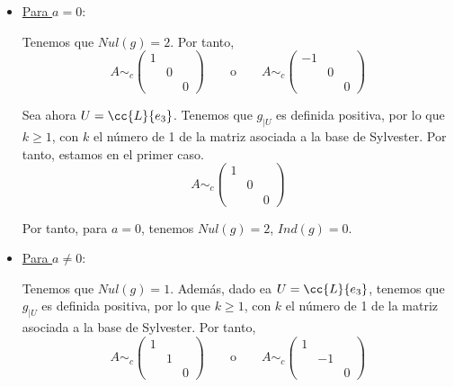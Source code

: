 \begin{ejercicio}
\begin{enumerate}
        \begin{itemize}
            \item \underline{Para $a=0$}:

            Tenemos que $Nul(g)=2$. Por tanto,
            \begin{equation*}
                A \sim_c \left(\begin{array}{ccc}
                    1 &  \\
                    & 0 \\
                    && 0 
                \end{array} \right)
                \qquad \text{o} \qquad
                A \sim_c \left(\begin{array}{ccc}
                    -1 &  \\
                    & 0 \\
                    && 0 
                \end{array} \right)
            \end{equation*}

            Sea ahora $U=\cc{L}\{e_3\}$. Tenemos que $g_{\left|U \right.}$ es definida positiva, por lo que $k\geq 1$, con $k$ el número de 1 de la matriz asociada a la base de Sylvester. Por tanto, estamos en el primer caso.
            \begin{equation*}
                A \sim_c \left(\begin{array}{ccc}
                    1 &  \\
                    & 0 \\
                    && 0 
                \end{array} \right)
            \end{equation*}

            Por tanto, para $a=0$, tenemos $Nul(g)=2$, $Ind(g)=0$.

            \item \underline{Para $a\neq0$}:

            Tenemos que $Nul(g)=1$. Además, dado ea $U=\cc{L}\{e_3\}$, tenemos que $g_{\left|U \right.}$ es definida positiva, por lo que $k\geq 1$, con $k$ el número de 1 de la matriz asociada a la base de Sylvester. Por tanto,
            \begin{equation*}
                A \sim_c \left(\begin{array}{ccc}
                    1 &  \\
                    & 1 \\
                    && 0 
                \end{array} \right)
                \qquad \text{o} \qquad
                A \sim_c \left(\begin{array}{ccc}
                    1 &  \\
                    & -1 \\
                    && 0 
                \end{array} \right)
            \end{equation*}


\end{itemize}
\end{enumerate}
\end{ejercicio}
